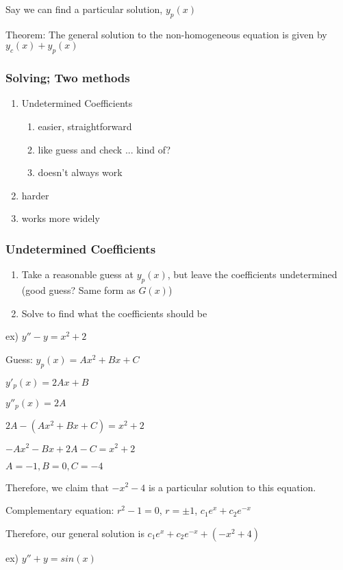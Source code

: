 \documentclass{article}
\begin{document}
Say we can find a particular solution, $y_p(x)$

Theorem: The general solution to the non-homogeneous equation is given by $y_c(x)+y_p(x)$

\subsubsection{Solving; Two methods}

\begin{enumerate}
    \item Undetermined Coefficients
    \begin{enumerate}
        \item easier, straightforward
        \item like guess and check ... kind of?
        \item doesn't always work
    \end{enumerate}
    \item harder
    \item works more widely
\end{enumerate}

\subsubsection{Undetermined Coefficients}

\begin{enumerate}
    \item Take a reasonable guess at $y_p(x)$, but leave the coefficients undetermined (good guess? Same form as $G(x)$)
    \item Solve to find what the coefficients should be
\end{enumerate}

ex) $y''-y=x^2+2$

Guess: $y_p(x)=Ax^2+Bx+C$

$y'_p(x)=2Ax+B$

$y''_p(x)=2A$

$2A-(Ax^2+Bx+C)=x^2+2$

$-Ax^2-Bx+2A-C=x^2+2$

$A=-1, B=0, C=-4$

Therefore, we claim that $-x^2-4$ is a particular solution to this equation.

Complementary equation: $r^2-1=0$, $r=\pm 1$, $c_1 e^x+c_2e^{-x}$

Therefore, our general solution is $c_1 e^x+c_2 e^{-x}+(-x^2+4)$

ex) $y''+y=sin(x)$
\end{document}
